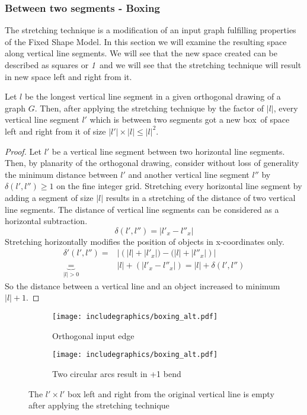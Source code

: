 \subsubsection*{Between two segments - \grqq Boxing\grqq}
The stretching technique is a modification of an input graph fulfilling properties of the Fixed Shape Model. In this section we will examine the resulting space along vertical line segments. We will see that the new space created can be described as squares or \textit{1}~and we will see that the stretching technique will result in new space left and right from it.
\begin{lemma}
	Let $l$ be the longest vertical line segment in a given orthogonal drawing of a graph $G$. Then, after applying the stretching technique by the factor of $|l|$, every vertical line segment $l'$ which is between two segments got a new \grqq box\grqq~of space left and right from it of size $|l'|\times |l| \leq |l|^2$.\label{lem:space_stretch}
\end{lemma}
\begin{proof}
	Let $l'$ be a vertical line segment between two horizontal line segments. Then, by planarity of the orthogonal drawing, consider without loss of generality the minimum distance between $l'$ and another vertical line segment $l''$ by $\delta(l',l'') \geq 1$ on the fine integer grid. Stretching every horizontal line segment by adding a segment of size $|l|$ results in a stretching of the distance of two vertical line segments. The distance of vertical line segments can be considered as a horizontal subtraction. $$\delta(l',l'') = |l'_x - l''_x|$$
Stretching horizontally modifies the position of objects in x-coordinates only.
\begin{align}
\delta'(l',l'') = &|\left(|l| + |l'_x|) - (|l| + |l''_x|\right)|\\
 \underbrace{=}_{|l| > 0} &|l| + \left(|l'_x - l''_x|\right) = |l| + \delta(l',l'')
\end{align}
So the distance between a vertical line and an object increased to minimum $|l|+1$.
\end{proof}
\begin{figure}[H]
	\centering
	\begin{subfigure}{0.3\textwidth}
			\centering
			\texttt{[image: includegraphics/boxing\_alt.pdf]}
			\caption{Orthogonal input edge}
	\end{subfigure}
	\begin{subfigure}{0.66\textwidth}
			\centering
			\texttt{[image: includegraphics/boxing\_alt.pdf]}
			\caption{Two circular arcs result in +1 bend}\label{im:boxes}
\end{subfigure}
	\caption{The $l'\times l'$ box left and right from the original vertical line is empty after applying the stretching technique}
\end{figure}

